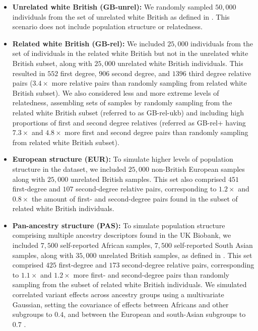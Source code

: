 \begin{itemize}
    \item \textbf{Unrelated white British (GB-unrel):}
    We randomly sampled $50{,}000$ individuals from the set of unrelated white British as defined in \cite{bycroft2018uk}.
    This scenario does not include population structure or relatedness.
    \item \textbf{Related white British (GB-rel):}
    We included $25,000$ individuals from the set of individuals in the related white British but not in the unrelated white British subset, along with $25,000$ unrelated white British individuals.
    This resulted in $552$ first degree, $906$ second degree, and $1396$ third degree relative pairs ($3.4 \times$ more relative pairs than randomly sampling from related white British subset). 
    We also considered less and more extreme levels of relatedness, assembling sets of samples by randomly sampling from the related white British subset (referred to as GB-rel-ukb) and including high proportions of first and second degree relatives (referred as GB-rel+ having $7.3 \times$ and $4.8 \times$ more first and second degree pairs than randomly sampling from related white British subset).
    \item \textbf{European structure (EUR):}
    To simulate higher levels of population structure in the dataset, we included $25{,}000$ non-British European samples \cite{bycroft2018uk} along with $25{,}000$ unrelated British samples. This set also comprised $451$ first-degree and $107$ second-degree relative pairs, corresponding to $1.2 \times$ and $0.8 \times$ the amount of first- and second-degree pairs found in the subset of related white British individuals.
    \item \textbf{Pan-ancestry structure (PAS):}
    To simulate population structure comprising multiple ancestry descriptors found in the UK Biobank, we included $7{,}500$ self-reported African samples, $7{,}500$ self-reported South Asian samples, along with $35{,}000$ unrelated British samples, as defined in \cite{bycroft2018uk}.
    This set comprised $425$ first-degree and $173$ second-degree relative pairs, corresponding to $1.1 \times$ and $1.2 \times$ more first- and second-degree pairs than randomly sampling from the subset of related white British individuals.
    We simulated correlated variant effects across ancestry groups using a multivariate Gaussian, setting the covariance of effects between Africans and other subgroups to $0.4$, and between the European and south-Asian subgroups to $0.7$ \cite{ruan2022improving}.
\end{itemize}
